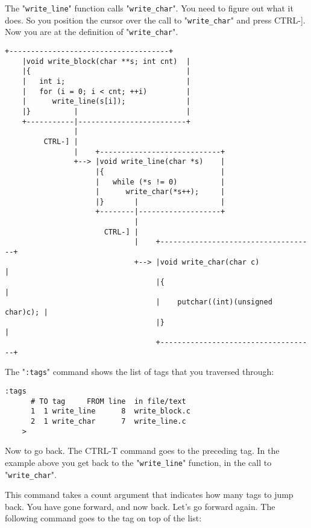 The "\texttt{write\_line}" function calls "\texttt{write\_char}".
You need to figure out what it does.
So you position the cursor over the call to "\texttt{write\_char}" and press CTRL-].
Now you are at the definition of "\texttt{write\_char}".

\begin{Verbatim}[samepage=true]
    +-------------------------------------+
    |void write_block(char **s; int cnt)  |
    |{                                    |
    |   int i;                            |
    |   for (i = 0; i < cnt; ++i)         |
    |      write_line(s[i]);              |
    |}          |                         |
    +-----------|-------------------------+
                |
         CTRL-] |
                |    +----------------------------+
                +--> |void write_line(char *s)    |
                     |{                           |
                     |   while (*s != 0)          |
                     |      write_char(*s++);     |
                     |}       |                   |
                     +--------|-------------------+
                              |
                       CTRL-] |
                              |    +------------------------------------+
                              +--> |void write_char(char c)             |
                                   |{                                   |
                                   |    putchar((int)(unsigned char)c); |
                                   |}                                   |
                                   +------------------------------------+
\end{Verbatim}

The "\texttt{:tags}" command shows the list of tags that you traversed through:

\begin{Verbatim}[samepage=true]
    :tags
      # TO tag     FROM line  in file/text 
      1  1 write_line      8  write_block.c 
      2  1 write_char      7  write_line.c 
    > 
\end{Verbatim}

Now to go back.
The CTRL-T command goes to the preceding tag.
In the example above you get back to the "\texttt{write\_line}" function, in the call to "\texttt{write\_char}".

This command takes a count argument that indicates how many tags to jump back.
You have gone forward, and now back.
Let's go forward again.
The following command goes to the tag on top of the list:

